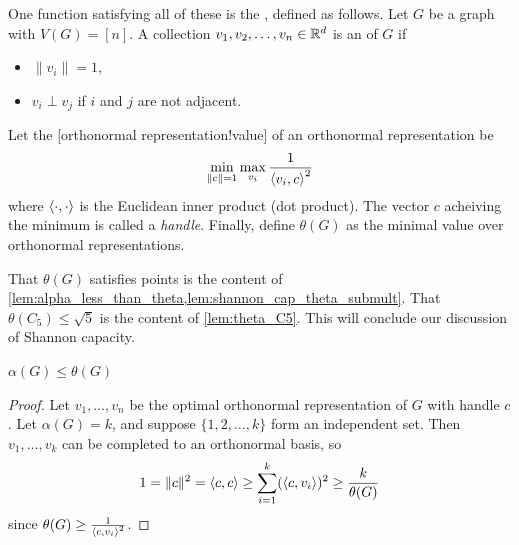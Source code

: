 One function satisfying all of these is the , defined as follows.
Let $G$ be a graph with $V(G) = [n]$. A collection $v_1,v_2,\dotsc,v_n\in \mathbb{R}^d$ is an  of $G$ if
\begin{itemize}
	\item $\|v_i\| = 1$,
	\item $v_i \perp v_j$ if $i$ and $j$ are not adjacent. 
\end{itemize}
Let the [orthonormal representation!value] of an orthonormal representation be
\[
\min_{\|c\|=1} \max_{v_i} \frac{1}{\braket{v_i,c}^2}
\]
where $\braket{\cdot,\cdot}$ is the Euclidean inner product (dot product).
The vector $c$ acheiving the minimum is called a \emph{handle}.
Finally, define $\theta(G)$ as the minimal value over orthonormal representations.

That $\theta(G)$ satisfies points  is the content of \cref{lem:alpha_less_than_theta,lem:shannon_cap_theta_submult}. That $\theta(C_5) \leq \sqrt{5}$ is the content of  \cref{lem:theta_C5}. This will conclude our discussion of Shannon capacity.

\begin{lemma} \label{lem:alpha_less_than_theta}
$\alpha(G)\leq \theta(G)$
\end{lemma}
\begin{proof}	
Let $v_1,\dotsc,v_n$ be the optimal orthonormal representation of $G$ with handle $c$. Let $\alpha(G) = k$, and suppose $\{1,2,\dotsc,k\}$ form an independent set. Then $v_1,\dotsc,v_k$ can be completed to an orthonormal basis, so
\[
	1=\|c\|^2 = \braket{c,c} \geq \sum_{i=1}^k (\braket{c,v_i})^2  \geq \frac{k}{\theta(G)}
\]
since
$\theta(G) \geq \frac{1}{\braket{c,v_i}^2}$.
\end{proof}


